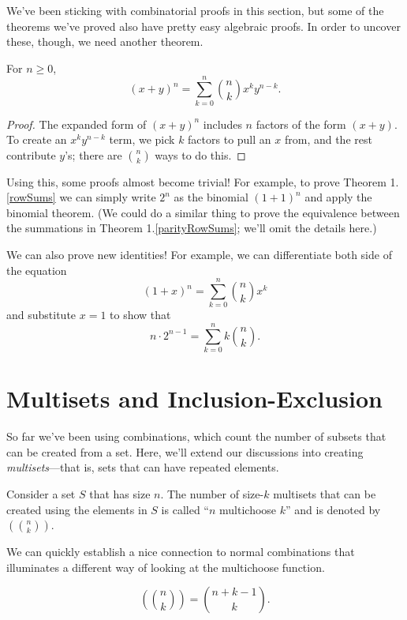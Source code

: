\documentclass[../m055main.tex]{subfiles}
\begin{document}
We've been sticking with combinatorial proofs in this section, but some of the theorems we've proved also have pretty easy algebraic proofs.
In order to uncover these, though, we need another theorem.

\begin{theorem}
    For $n \geq 0$,
    \[ (x+y)^{n} = \sum_{k=0}^{n} {n \choose k} x^{k} y^{n-k}. \]
\end{theorem}

\begin{proof}
    The expanded form of $(x+y)^{n}$ includes $n$ factors of the form $(x+y)$.
    To create an $x^{k} y^{n-k}$ term, we pick $k$ factors to pull an $x$ from, and the rest contribute $y$'s; there are ${n \choose k}$ ways to do this.
\end{proof}

Using this, some proofs almost become trivial!
For example, to prove Theorem 1.\ref{rowSums} we can simply write $2^{n}$ as the binomial $(1+1)^{n}$ and apply the binomial theorem.
(We could do a similar thing to prove the equivalence between the summations in Theorem 1.\ref{parityRowSums}; we'll omit the details here.)

We can also prove new identities!
For example, we can differentiate both side of the equation
\[ (1+x)^{n} = \sum_{k=0}^{n} {n \choose k} x^{k} \]
and substitute $x=1$ to show that
\[ n \cdot 2^{n-1} = \sum_{k=0}^{n} k {n \choose k}. \]

\section{Multisets and Inclusion-Exclusion}
So far we've been using combinations, which count the number of subsets that can be created from a set.
Here, we'll extend our discussions into creating \textit{multisets}---that is, sets that can have repeated elements.

\begin{definition}[Multichoose]
    Consider a set $S$ that has size $n$.
    The number of size-$k$ multisets that can be created using the elements in $S$ is called ``$n$ multichoose $k$'' and is denoted by $\left( {n \choose k} \right)$.
\end{definition}

We can quickly establish a nice connection to normal combinations that illuminates a different way of looking at the multichoose function.

\begin{theorem}
    \[ \left( {n \choose k} \right) = {n+k-1 \choose k}. \]
\end{theorem}
\end{document}

